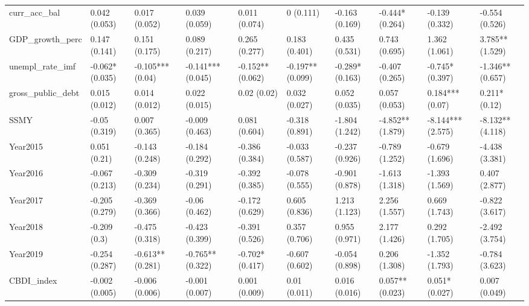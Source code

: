 \begin{table}[ht]
\begin{tabular}{llllllllll}
  curr\_acc\_bal & 0.042 (0.053) & 0.017 (0.052) & 0.039 (0.059) & 0.011 (0.074) & 0 (0.111) & -0.163 (0.169) & -0.444* (0.264) & -0.139 (0.332) & -0.554 (0.526) \\ 
  GDP\_growth\_perc & 0.147 (0.141) & 0.151 (0.175) & 0.089 (0.217) & 0.265 (0.277) & 0.183 (0.401) & 0.435 (0.531) & 0.743 (0.695) & 1.362 (1.061) & 3.785** (1.529) \\ 
  unempl\_rate\_imf & -0.062* (0.035) & -0.105*** (0.04) & -0.141*** (0.045) & -0.152** (0.062) & -0.197** (0.099) & -0.289* (0.163) & -0.407 (0.265) & -0.745* (0.397) & -1.346** (0.657) \\ 
  gross\_public\_debt & 0.015 (0.012) & 0.014 (0.012) & 0.022 (0.015) & 0.02 (0.02) & 0.032 (0.027) & 0.052 (0.035) & 0.057 (0.053) & 0.184*** (0.07) & 0.211* (0.12) \\ 
  SSMY & -0.05 (0.319) & 0.007 (0.365) & -0.009 (0.463) & 0.081 (0.604) & -0.318 (0.891) & -1.804 (1.242) & -4.852** (1.879) & -8.144*** (2.575) & -8.132** (4.118) \\ 
  Year2015 & 0.051 (0.21) & -0.143 (0.248) & -0.184 (0.292) & -0.386 (0.384) & -0.033 (0.587) & -0.237 (0.926) & -0.789 (1.252) & -0.679 (1.696) & -4.438 (3.381) \\ 
  Year2016 & -0.067 (0.213) & -0.309 (0.234) & -0.319 (0.291) & -0.392 (0.385) & -0.078 (0.555) & -0.901 (0.878) & -1.613 (1.318) & -1.393 (1.569) & 0.407 (2.877) \\ 
  Year2017 & -0.205 (0.279) & -0.369 (0.366) & -0.06 (0.462) & -0.172 (0.629) & 0.605 (0.836) & 1.213 (1.123) & 2.256 (1.557) & 0.669 (1.743) & -0.822 (3.617) \\ 
  Year2018 & -0.209 (0.3) & -0.475 (0.318) & -0.423 (0.399) & -0.391 (0.526) & 0.357 (0.706) & 0.955 (0.971) & 2.177 (1.426) & 0.292 (1.705) & -2.492 (3.754) \\ 
  Year2019 & -0.254 (0.287) & -0.613** (0.281) & -0.765** (0.322) & -0.702* (0.417) & -0.607 (0.602) & -0.054 (0.898) & 0.206 (1.308) & -1.352 (1.793) & -0.784 (3.623) \\ 
  CBDI\_index & -0.002 (0.005) & -0.006 (0.006) & -0.001 (0.007) & 0.001 (0.009) & 0.01 (0.011) & 0.016 (0.016) & 0.057** (0.023) & 0.051* (0.027) & 0.007 (0.049) \\ 
   \bottomrule
\end{tabular}
\endgroup
\end{table}

